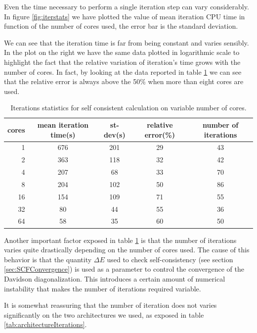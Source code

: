 \documentclass[a4paper,12pt]{article}
\begin{document}
Even the time necessary to perform a single iteration step can vary considerably.
In figure \ref{fig:iterstats} we have plotted the value of mean iteration CPU time in function of the number of cores used, the error bar is the standard deviation.

We can see that the iteration time is far from being constant and varies sensibly. 
In the plot on the right we have the same data plotted in logarithmic scale to highlight the fact that the relative variation of iteration's time grows with the number of cores.
In fact, by looking at the data reported in table \ref{tab:iterations} we can see that the relative error is always above the 50\% when more than eight cores are used.


\begin{table}[hhh!]
\begin{center}
\begin{tabular}{r|cccc}
\toprule
cores &        mean iteration time(s) &         st-dev(s) &   relative error(\%) &   number of iterations \\
\midrule
1  &  676 &  201 &  29 &  43 \\
2  &  363 &  118 &  32 &  42 \\
4  &  207 &   68 &  33 &  70 \\
8  &  204 &  102 &  50 &  86 \\
16 &  154 &  109 &  71 &  55 \\
32 &   80 &   44 &  55 &  36 \\
64 &   58 &   35 &  60 &  50 \\
\bottomrule
\end{tabular}
\end{center}
\caption{Iterations statistics for self consistent calculation on variable number of cores.}
\label{tab:iterations}
\end{table}

Another important factor exposed in table \ref{tab:iterations} is that the number of iterations varies quite drastically depending on the number of cores used. 
The cause of this behavior is that the quantity $\Delta E$ used to check self-consistency (see section \ref{sec:SCFConvergence}) is used as a parameter to control the convergence of the Davidson diagonalization.
This introduces a certain amount of numerical instability that makes the number of iterations required variable.

It is somewhat reassuring that the number of iteration does not varies significantly on the two architectures we used, as exposed in table \ref{tab:architectureIterations}.
\end{document}
